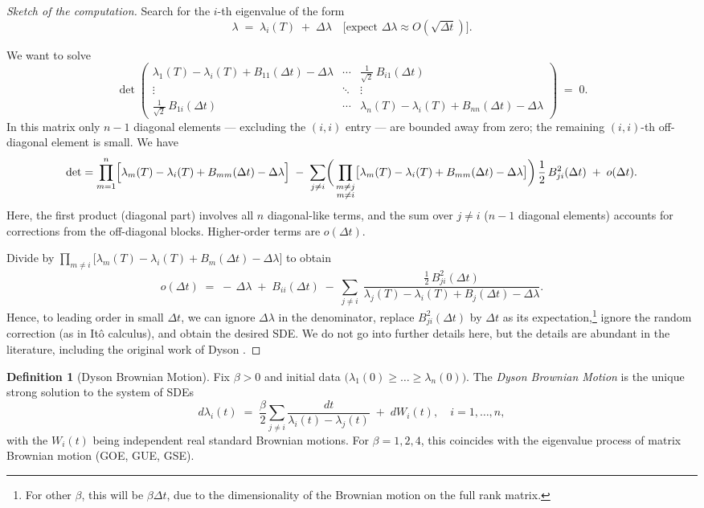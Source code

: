 \documentclass[letterpaper,11pt,oneside,reqno]{book}
\numberwithin{equation}{chapter}  %
\theoremstyle{definition}
\newtheorem{definition}[proposition]{Definition}
\begin{document}
\begin{proof}[Sketch of the computation]
Search for the $i$-th eigenvalue of the form
\[
\lambda \;=\; \lambda_i(T)\;+\;\Delta\lambda
\quad\bigl[\text{expect } \Delta\lambda \approx O(\sqrt{\Delta t})\bigr].
\]

\noindent
We want to solve
\[
\det\begin{pmatrix}
\lambda_{1}(T) - \lambda_{i}(T) + B_{11}(\Delta t) - \Delta\lambda
		& \cdots
		& \frac{1}{\sqrt2}\,B_{i1}(\Delta t) \\[6pt]
\vdots
		& \ddots
		& \vdots \\[6pt]
		\frac{1}{\sqrt2}\,B_{1i}(\Delta t)
		& \cdots
		& \lambda_{n}(T) - \lambda_{i}(T) + B_{nn}(\Delta t) - \Delta\lambda
\end{pmatrix}
\;=\;0.
\]
In this matrix only $n-1$ diagonal elements --- excluding the $(i,i)$ entry ---
are bounded away from zero; the remaining $(i,i)$-th off-diagonal element is small.
We have
\[
\det
= \prod_{m=1}^{n}\Bigl[\lambda_{m}(T) - \lambda_{i}(T) + B_{mm}(\Delta t) - \Delta\lambda\Bigr]
\;-\;
\sum_{j\neq i} \biggl(\,\prod_{\substack{m \neq j \\ m \neq i}}
			\bigl[\lambda_{m}(T) - \lambda_{i}(T) + B_{mm}(\Delta t) - \Delta\lambda\bigr]
\biggr)\,\frac{1}{2}\,B_{ji}^{2}(\Delta t)
\;+\;o(\Delta t).
\]
Here, the first product (diagonal part) involves all $n$ diagonal-like terms,
and the sum over $j \neq i$ ($n-1$ diagonal elements) accounts for corrections
from the off-diagonal blocks.
Higher-order terms are $o(\Delta t)$.

Divide by
\(\displaystyle \prod_{m \neq i}\bigl[\lambda_{m}(T) - \lambda_{i}(T)
					+ B_{m}(\Delta t) - \Delta\lambda\bigr]\)
to obtain
\[
o(\Delta t)
\;=\;
-\,\Delta\lambda
\;+\; B_{ii}(\Delta t)
\;-\;\sum_{j\neq i}\;
\frac{\tfrac12\,B_{ji}^2(\Delta t)}{\lambda_{j}(T) - \lambda_{i}(T)
						+ B_{j}(\Delta t) - \Delta\lambda}.
\]
Hence, to leading order in small $\Delta t$,
we can ignore $\Delta\lambda$ in the denominator,
replace $B_{ji}^2(\Delta t)$ by $\Delta t$ as its expectation,\footnote{For
other $\beta$, this will be $\beta \Delta t$, due to the dimensionality of the
Brownian motion on the full rank matrix.}
ignore
the random correction (as in It\^{o} calculus), and obtain the desired SDE.
We do not go into further details here, but the details are abundant in the literature,
including the original work of Dyson \cite{dyson1962brownian}.
\end{proof}

\begin{definition}[Dyson Brownian Motion]
\label{lecture10:def:DBM}
Fix $\beta>0$ and initial data $\bigl(\lambda_1(0)\ge \dots \ge \lambda_n(0)\bigr)$. The \emph{Dyson Brownian Motion} is the unique strong solution to the system of SDEs
\begin{equation}
\label{lecture10:eq:Dyson_SDE}
d\lambda_i(t)
\;=\;
\frac{\beta}{2}\sum_{j\neq i}\frac{dt}{\lambda_i(t)-\lambda_j(t)}
\;+\;
dW_i(t),
\quad
i=1,\dots,n,
\end{equation}
with the $W_i(t)$ being independent real standard Brownian motions. For $\beta=1,2,4$, this coincides with the eigenvalue process of matrix Brownian motion (GOE, GUE, GSE).
\end{definition}
\end{document}
